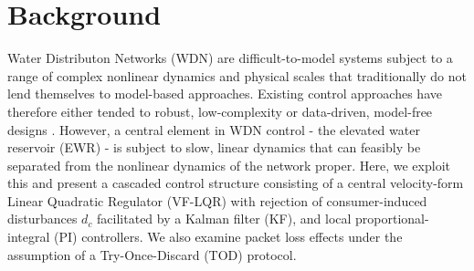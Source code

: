 \documentclass[conference]{IEEEtran}
\begin{document}
		
		
		
				
		\section{Background}\label{sec:BG}
		
		Water Distributon Networks (WDN) are difficult-to-model systems subject to a range of complex nonlinear dynamics and physical scales that traditionally do not lend themselves to model-based approaches. Existing control approaches have therefore either tended to robust, low-complexity \cite{Creaco2019} or data-driven, model-free designs \cite{Val2020,Kallesoe2017}. However, a central element in WDN control - the elevated water reservoir (EWR) - is subject to slow, linear dynamics that can feasibly be separated from the nonlinear dynamics of the network proper. Here, we exploit this and present a cascaded control structure consisting of a central velocity-form Linear Quadratic Regulator (VF-LQR) with rejection of consumer-induced disturbances $d_c$ facilitated by a Kalman filter (KF), and local proportional-integral (PI) controllers. We also examine packet loss effects under the assumption of a Try-Once-Discard (TOD) protocol.
		
\end{document}
